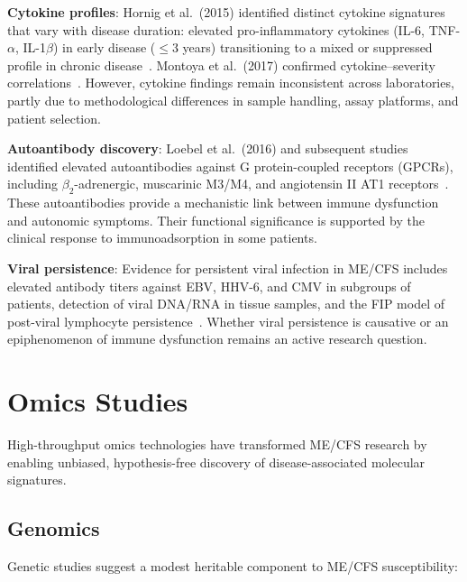 \textbf{Cytokine profiles}: Hornig et al.\ (2015) identified distinct cytokine signatures that vary with disease duration: elevated pro-inflammatory cytokines (IL-6, TNF-$\alpha$, IL-1$\beta$) in early disease ($\leq$3 years) transitioning to a mixed or suppressed profile in chronic disease~\cite{Hornig2015}. Montoya et al.\ (2017) confirmed cytokine--severity correlations~\cite{Montoya2017}. However, cytokine findings remain inconsistent across laboratories, partly due to methodological differences in sample handling, assay platforms, and patient selection.

\textbf{Autoantibody discovery}: Loebel et al.\ (2016) and subsequent studies identified elevated autoantibodies against G protein-coupled receptors (GPCRs), including $\beta_2$-adrenergic, muscarinic M3/M4, and angiotensin II AT1 receptors~\cite{Loebel2016, Sotzny2021, Bynke2020}. These autoantibodies provide a mechanistic link between immune dysfunction and autonomic symptoms. Their functional significance is supported by the clinical response to immunoadsorption in some patients.

\textbf{Viral persistence}: Evidence for persistent viral infection in ME/CFS includes elevated antibody titers against EBV, HHV-6, and CMV in subgroups of patients, detection of viral DNA/RNA in tissue samples, and the FIP model of post-viral lymphocyte persistence~\cite{Kol2026fipv}. Whether viral persistence is causative or an epiphenomenon of immune dysfunction remains an active research question.

\section{Omics Studies}
\label{sec:omics-studies}

High-throughput omics technologies have transformed ME/CFS research by enabling unbiased, hypothesis-free discovery of disease-associated molecular signatures.

\subsection{Genomics}

Genetic studies suggest a modest heritable component to ME/CFS susceptibility:

